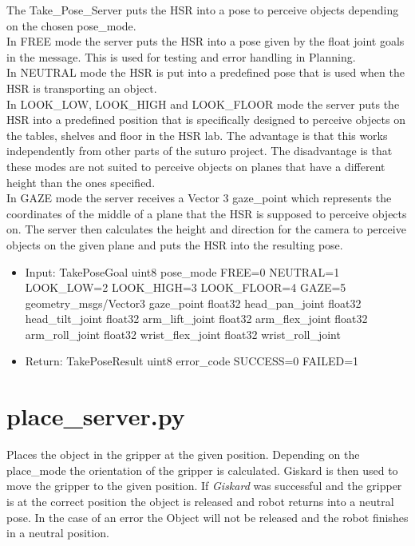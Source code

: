 \documentclass[main.tex]{subfiles}
\begin{document}
			The Take\_Pose\_Server puts the HSR into a pose to perceive objects depending on the chosen pose\_mode. \\
			In FREE mode the server puts the HSR into a pose given by the float joint goals in the message. This is used for testing and error handling in Planning. \\
			In NEUTRAL mode the HSR is put into a predefined pose that is used when the HSR is transporting an object. \\
			In LOOK\_LOW, LOOK\_HIGH and LOOK\_FLOOR mode the server puts the HSR into a predefined position that is specifically designed to perceive objects on the tables, shelves and floor in the HSR lab. The advantage is that this works independently from other parts of the suturo project. The disadvantage is that these modes are not suited to perceive objects on planes that have a different height than the ones specified. \\
			In GAZE mode the server receives a Vector 3 gaze\_point which represents the coordinates of the middle of a plane that the HSR is supposed to perceive objects on. The server then calculates the height and direction for the camera to perceive objects on the given plane and puts the HSR into the resulting pose.
			
			\begin{itemize}
				\item Input: TakePoseGoal 
				\subitem uint8 pose\_mode
				\subsubitem FREE=0
				\subsubitem NEUTRAL=1
				\subsubitem LOOK\_LOW=2
				\subsubitem LOOK\_HIGH=3
				\subsubitem LOOK\_FLOOR=4
				\subsubitem GAZE=5
				\subitem geometry\_msgs/Vector3 gaze\_point
				\subitem float32 head\_pan\_joint
				\subitem float32 head\_tilt\_joint
				\subitem float32 arm\_lift\_joint
				\subitem float32 arm\_flex\_joint
				\subitem float32 arm\_roll\_joint
				\subitem float32 wrist\_flex\_joint
				\subitem float32 wrist\_roll\_joint
				\item Return: TakePoseResult
				\subitem uint8 error\_code 
				\subsubitem SUCCESS=0
				\subsubitem FAILED=1
			\end{itemize}
			
			
			\section{place\_server.py}  
			Places the object in the gripper at the given position. Depending on the place\_mode the orientation of the gripper is calculated. Giskard is then used to move the gripper to the given position. If \textit{Giskard} was successful and the gripper is at the correct position the object is released and robot returns into a neutral pose. In the case of an error the Object will not be released and the robot finishes in a neutral position. 
			
\end{document}
